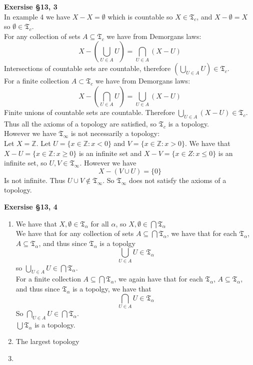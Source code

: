 \documentclass[12pt]{article}
\newenvironment{ques}[1]{\textbf{Exersise #1}\vspace{1 mm}\\ }{\bigskip}
\theoremstyle{definition}
\renewcommand{\l}{\left }
\renewcommand{\r}{\right }
\newcommand{\Z}{\mathbb Z}
\newcommand{\T}{\mathfrak{T}}
\begin{document}
\begin{ques}{\S 13, 3}
	In example 4 we have $X - X = \emptyset$ which is countable so $X \in
	\T_c$, and $X - \emptyset = X$ so $\emptyset \in \T_c$.\\
	For any collection of sets $A \subseteq \T_c$ we have from Demorgans laws:
	$$X - \l(\bigcup_{U \in A}U \r) = \bigcap_{U \in A} (X - U)$$
	Intersections of countable sets are countable, therefore $\l(\bigcup_{U
	\in A}U \r) \in \T_c$.\\
	For a finite collection $A \subset \T_c$ we have from Demorgans laws:
	$$X - \l(\bigcap_{U \in A}U \r) = \bigcup_{U \in A} (X - U)$$
	Finite unions of countable sets are countable. Therefore $\bigcup_{U
	\in A} (X - U) \in \T_c$. Thus all the axioms of a topology are
	satisfied, so $\T_c$ is a topology.\\
	However we have $\T_\infty$ is not necessarily a topology:\\
	Let $X = \Z$. Let $U = \{x \in \Z: x < 0\}$ and $V = \{x \in \Z: x >
	0\}$. We have that $X - U = \{x \in \Z: x \geq 0\}$ is an infinite set
	and $X-V = \{x \in Z: x \leq 0\}$ is an infinite set, so $U,V \in
	\T_\infty$. However we have
	$$X - \l(V \cup U\r) = \{0\}$$
	Is not infinite. Thus $U \cup V \notin \T_\infty$. So $\T_\infty$ does
	not satisfy the axioms of a topology.
	
\end{ques}

\begin{ques}{\S 13, 4}
	\begin{enumerate}
		\item
			We have that $X, \emptyset \in \T_\alpha$ for all $\alpha$,
			so $X, \emptyset \in \bigcap \T_\alpha$\\
			We have that for any collection of sets $A \subseteq
			\bigcap \T_\alpha$, we have that for  each
			$\T_\alpha$,  $A \subseteq \T_\alpha$, and thus since
			$\T_\alpha$ is a topolgy
			$$\bigcup_{U \in A} U \in \T_\alpha$$
			so $\bigcup_{U \in A} U \in \bigcap\T_\alpha$.\\
			For a finite collection $A \subseteq \bigcap
			\T_\alpha$, we again have that for  each
			$\T_\alpha$,  $A \subseteq \T_\alpha$, and thus since
			$\T_\alpha$ is a topolgy, we have that 
			$$\bigcap_{U \in A} U \in \T_\alpha$$
			So $\bigcap_{U \in A} U \in \bigcap\T_\alpha$.\\
			$\bigcup \T_\alpha$ is a topology.
		\item

			The largest topology 
		\item
	\end{enumerate}
\end{ques}
\end{document}
